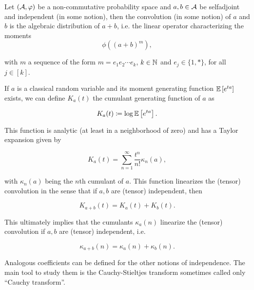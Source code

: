     \begin{definition}
        Let $(\mathcal A,\varphi)$ be a non-commutative probability space and $a,b\in\mathcal A$ be {\color{red} selfadjoint and} independent (in some notion), then the convolution (in some notion) of $a$ and $b$ is the algebraic distribution of $a+b$, i.e. the linear operator characterizing the moments
        \begin{equation*}
            \phi\left((a+b)^{m}\right),
        \end{equation*}

        \noindent with $m$ a sequence of the form $m = e_1 e_2 \cdots e_k$, $k\in \mathbb N$ and $e_j \in \{1,*\}$, for all $j \in [k]$.
    \end{definition}

    If $a$ is a classical random variable and its moment generating function $\mathbb E \left[ e^{ta} \right]$ exists, we can define $K_a(t)$ the cumulant generating function of $a$ as

    \begin{equation*}
        K_a(t) \coloneqq \log \mathbb E \left[  e^{ta}  \right].
    \end{equation*}

    This function is analytic (at least in a neighborhood of zero) and has a Taylor expansion given by

    \begin{equation*}
        K_a(t) =  \sum_{n=1}^\infty \frac{t^n}{n!} \kappa_n(a),
    \end{equation*}

    \noindent with $\kappa_n(a)$ being the $n$th cumulant of $a$. This function linearizes the (tensor) convolution in the sense that if $a,b$ are (tensor) independent, then

    \begin{equation*}
        K_{a+b}(t) = K_a(t)+K_b(t).
    \end{equation*}

    This ultimately implies that the cumulants $\kappa_a(n)$ linearize the (tensor) convolution if $a,b$ are (tensor) independent, i.e.

    \begin{equation*}
        \kappa_{a+b}(n) = \kappa_a(n) + \kappa_b(n).
    \end{equation*}

    Analogous coefficients can be defined for the other notions of independence. The main tool to study them is the Cauchy-Stieltjes transform sometimes called only ``Cauchy transform''.


